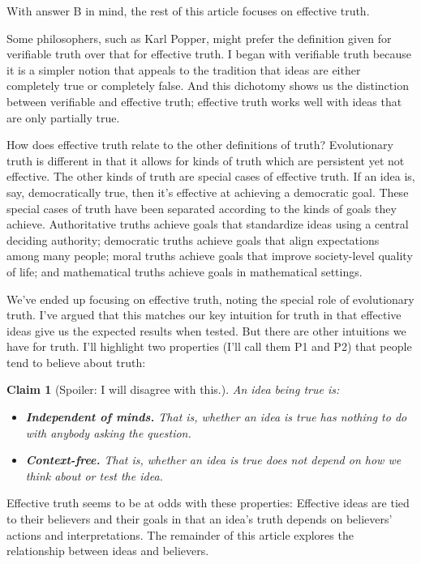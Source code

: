 \documentclass[11pt, oneside]{article}
\newtheorem*{claim}{Claim}
\begin{document}
With answer B in mind, the rest of this article focuses on effective truth.

Some philosophers, such as Karl Popper, might prefer the definition given for
verifiable truth over that for effective truth.
I began with verifiable truth because it is a simpler notion that appeals to the
tradition that ideas are either completely true or completely false.
And this dichotomy shows us the distinction between verifiable and effective
truth; effective truth works well with ideas that are only partially true.

How does effective truth relate to the other definitions of truth?
Evolutionary truth is different in that
it allows for kinds of truth which are persistent yet not effective.
The other kinds of truth are special cases of effective truth.
If an
idea is, say, democratically true, then it's effective at achieving a democratic
goal. These special cases of truth have been separated
according to the kinds of goals they achieve. Authoritative truths achieve goals
that standardize ideas using a central deciding authority; democratic truths
achieve goals that align expectations among many people; moral truths achieve
goals that improve society-level quality of life;
and mathematical truths achieve
goals in mathematical settings.

We've ended up focusing on effective truth, noting the special role of
evolutionary truth. I've argued that this matches our key intuition for truth in
that effective ideas give us the expected results when tested. But there are
other intuitions we have for truth. I'll highlight two properties (I'll call
them P1 and P2) that people tend to believe about truth:
\begin{claim}[Spoiler: I will disagree with this.]\label{c7}
    An idea being true is:
\begin{itemize}
    \item{} {\normalfont [{\bf P1.}]}
        {\bf Independent of minds.} That is, whether an idea is true has
        nothing to
        do with anybody asking the question.
    \item{} {\normalfont [{\bf P2.}]}
        {\bf Context-free.} That is, whether an idea is true does not depend
        on
        how we think about or test the idea.
\end{itemize}
\end{claim}
Effective truth seems to be at odds with these properties:
Effective ideas are tied to their believers and their goals in that
an idea's truth depends on believers' actions and interpretations.
The remainder of this
article explores the relationship between ideas and believers.
\end{document}
